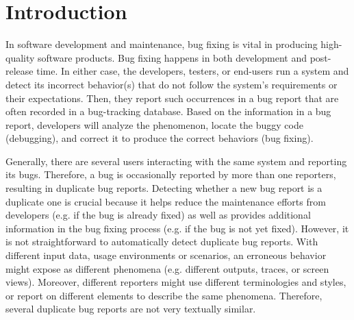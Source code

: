 \section{Introduction}
\label{intro}



In software development and maintenance, bug fixing is vital in
producing high-quality software products. Bug fixing happens in both
development and post-release time. In either case, the developers,
testers, or end-users run a system and detect its incorrect
behavior(s) that do not follow the system's requirements or their
expectations. Then, they report such occurrences in a bug report that
are often recorded in a bug-tracking database. Based on the
information in a bug report, developers will analyze the phenomenon,
locate the buggy code (debugging), and correct it to produce the
correct behaviors (bug fixing).


Generally, there are several users interacting with the same system
and reporting its bugs. Therefore, a bug is occasionally reported by
more than one reporters, resulting in duplicate bug reports. Detecting
whether a new bug report is a duplicate one is crucial because it
helps reduce the maintenance efforts from developers (e.g. if the bug
is already fixed) as well as provides additional information in the
bug fixing process (e.g. if the bug is not yet fixed). However, it is
not straightforward to automatically detect duplicate bug
reports. With different input data, usage environments or scenarios,
an erroneous behavior might expose as different phenomena
(e.g. different outputs, traces, or screen views). Moreover, different
reporters might use different terminologies and styles, or report on
different elements to describe the same phenomena.
Therefore, several duplicate bug reports are not very textually
similar.

